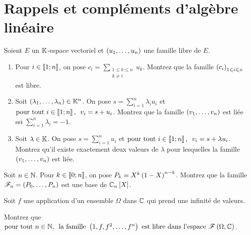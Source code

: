 \chapter{Rappels et compléments d'algèbre linéaire}

\legendeexercices

\begin{exopss}[Exercice 1]
Soient \(E\) un \(\mathbb{K}\)-espace vectoriel et \(\left(u_1,\dots,u_n\right)\) une famille libre de \(E\).

\begin{enumerate}
    \item Pour \(i\in\left\llbracket1;n\right\rrbracket\), on pose \(c_i=\sum_{\substack{1\leq k\leq n \\ k\not=i}}u_k\). Montrez que la famille \(\left(c_i\right)_{1\leqslant i\leqslant n}\) est libre. \\
    \item Soit \(\left(\lambda_1,\dots,\lambda_n\right)\in\mathbb{K}^n\). On pose \(s=\sum_{i=1}^n\lambda_iu_i\) et \(\quantifs{\tpt i\in\interventierii{1}{n}}v_i=s+u_i\). Montrez que la famille \(\left(v_1,\dots,v_n\right)\) est liée ssi \(\sum_{i=1}^n\lambda_i=-1\). \\
    \item Soit \(\lambda\in\mathbb{K}\). On pose \(s=\sum_{i=1}^nu_i\) et \(\quantifs{\tpt i\in\interventierii{1}{n}}v_i=s+\lambda u_i\). Montrez qu'il existe exactement deux valeurs de \(\lambda\) pour lesquelles la famille \(\left(v_1,\dots,v_n\right)\) est liée.
\end{enumerate}
\end{exopss}

\begin{corr}
\end{corr}

\begin{exopss}[Exercice 2]
Soit \(n\in\mathbb{N}\). Pour \(k\in\left\llbracket0;n\right\rrbracket\), on pose \(P_k=X^k\left(1-X\right)^{n-k}\). Montrez que la famille \(\mathscr{F}_n=\left(P_0,\dots,P_n\right)\) est une base de \(\polydeg[\C]{n}\).
\end{exopss}

\begin{corr}
\end{corr}

\begin{exopss}[Exercice 3]
Soit \(f\) une application d'un ensemble \(\Omega\) dans \(\mathbb{C}\) qui prend une infinité de valeurs.

Montrez que \(\quantifs{\tpt n\in\N}\text{la famille }\paren{1,f,f^2,\dots,f^n}\text{ est libre dans l'espace }\F{\Omega}{\C}\).
\end{exopss}

